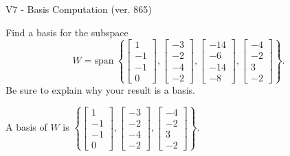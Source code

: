 \begin{exercise}
  \begin{exerciseTitle}V7 - Basis Computation (ver. 865)\end{exerciseTitle}
  \begin{exerciseStatement}
    Find a basis for the subspace 
\[W=\mathrm{span}\ \left\{\left[\begin{array}{r}
1 \\
-1 \\
-1 \\
0
\end{array}\right] , \left[\begin{array}{r}
-3 \\
-2 \\
-4 \\
-2
\end{array}\right] , \left[\begin{array}{r}
-14 \\
-6 \\
-14 \\
-8
\end{array}\right] , \left[\begin{array}{r}
-4 \\
-2 \\
3 \\
-2
\end{array}\right]\right\}.\]
 Be sure to explain why your result is a basis.


  \end{exerciseStatement}
  \begin{exerciseAnswer}
   A basis of \(W\) is  \(\left\{\left[\begin{array}{r}
1 \\
-1 \\
-1 \\
0
\end{array}\right] , \left[\begin{array}{r}
-3 \\
-2 \\
-4 \\
-2
\end{array}\right] , \left[\begin{array}{r}
-4 \\
-2 \\
3 \\
-2
\end{array}\right]\right\}\).
  


  \end{exerciseAnswer}
\end{exercise}